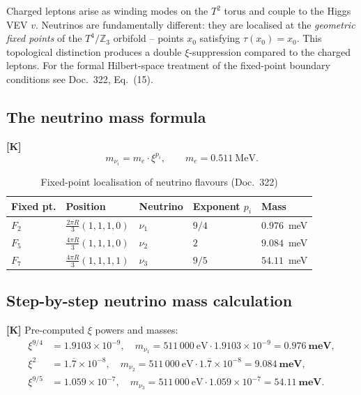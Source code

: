 Charged leptons arise as winding modes on the $T^2$ torus and couple
to the Higgs VEV $v$. Neutrinos are fundamentally different: they are
localised at the \emph{geometric fixed points} of the
$T^4/\mathbb{Z}_3$ orbifold -- points $x_0$ satisfying
$\tau(x_0) = x_0$. This topological distinction produces a double
$\xi$-suppression compared to the charged leptons.
For the formal Hilbert-space treatment of the fixed-point boundary
conditions see Doc.~322, Eq.~(15).

\subsection{The neutrino mass formula}

\textbf{[K]}
\begin{equation}
  m_{\nu_i} = m_e\cdot\xi^{p_i},\qquad m_e = 0.511~\text{MeV}.
  \label{eq:nu_mass}
\end{equation}

\begin{table}[h]
\centering
\caption{Fixed-point localisation of neutrino flavours (Doc.~322)}
\label{tab:fixpoints}
\begin{tabular}{lllll}
\toprule
Fixed pt. & Position & Neutrino & Exponent $p_i$ & Mass \\
\midrule
$F_2$ & $\frac{2\pi R}{3}(1,1,1,0)$ & $\nu_1$ & $9/4$ & $0.976$~meV \\
$F_5$ & $\frac{4\pi R}{3}(1,1,1,0)$ & $\nu_2$ & $2$   & $9.084$~meV \\
$F_7$ & $\frac{4\pi R}{3}(1,1,1,1)$ & $\nu_3$ & $9/5$ & $54.11$~meV \\
\bottomrule
\end{tabular}
\end{table}

\subsection{Step-by-step neutrino mass calculation}

\textbf{[K]} Pre-computed $\xi$ powers and masses:
\begin{align}
  \xi^{9/4} &= 1.9103\times10^{-9},\quad
  m_{\nu_1} = 511\,000~\text{eV}\cdot1.9103\times10^{-9}
            = \mathbf{0.976}~\mathbf{meV},\\
  \xi^{2}   &= 1.\overline{7}\times10^{-8},\quad
  m_{\nu_2} = 511\,000~\text{eV}\cdot1.\overline{7}\times10^{-8}
            = \mathbf{9.084}~\mathbf{meV},\\
  \xi^{9/5} &= 1.059\times10^{-7},\quad
  m_{\nu_3} = 511\,000~\text{eV}\cdot1.059\times10^{-7}
            = \mathbf{54.11}~\mathbf{meV}.
\end{align}

